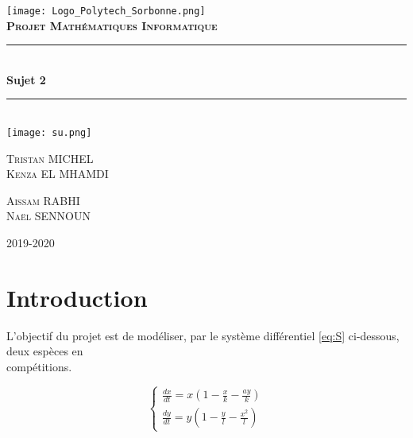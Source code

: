 \documentclass{article}
\newcommand{\HRule}{\rule{\linewidth}{0.5mm}}
\begin{document}

\begin{titlepage}
    \begin{sffamily}
        \begin{center}
            \texttt{[image: Logo\_Polytech\_Sorbonne.png]}\\[1.5cm]
            \textsc{\Large \bfseries{Projet Mathématiques Informatique}}\\[1.5cm]
            \HRule \\[0.4cm]
            { \huge \bfseries Sujet 2\\[0.4cm]}
            \HRule \\[2cm]
            \texttt{[image: su.png]}\\[2cm]
            \begin{minipage}{0.4\textwidth}
                \begin{flushleft} \large
                    \textsc{Tristan MICHEL\\ Kenza EL MHAMDI }
                \end{flushleft}
            \end{minipage}
            \begin{minipage}{0.4\textwidth}
                \begin{flushright} \large
                    \textsc{Aissam RABHI\\ Naël SENNOUN}
                \end{flushright}
            \end{minipage}
            \vfill
        
            {\large 2019-2020}
            
        \end{center}
    \end{sffamily}
\end{titlepage}

\tableofcontents
\newpage

\section*{Introduction}
L'objectif du projet est de modéliser, par le système différentiel \eqref{eq:S} ci-dessous, deux espèces en \\compétitions.

\begin{equation}
\tag{S}
\label{eq:S}
\left\{
\begin{array}{ll}
    \frac{dx}{dt} =  x(1 - \frac{x}{k} - \frac{a y}{k}) \\
    \frac{dy}{dt} = y(1- \frac{y}{l} - \frac{x^{2}}{l})
\end{array}
\right.
\end{equation}\\
\end{document}

